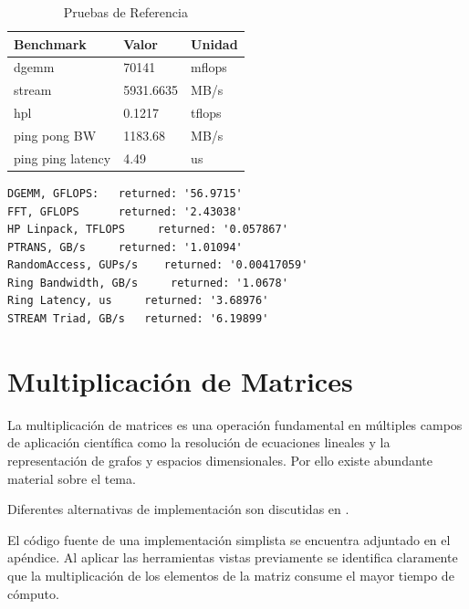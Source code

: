 \documentclass[a4paper]{report}
\begin{document}
\begin{table}[H]
\caption{Pruebas de Referencia}
  \begin{center}
    \begin{tabular}{|l|l|l|}\hline
      {\bf Benchmark} & {\bf Valor} & {\bf Unidad} \\ \hline
      dgemm & 70141 & mflops \\ \hline
      stream & 5931.6635 & MB/s \\ \hline
      hpl & 0.1217 & tflops \\ \hline
      ping pong BW & 1183.68 & MB/s \\ \hline
      ping ping latency & 4.49 & us \\ \hline
    \end{tabular}
    \end{center}
 \label{table:pruebas}
\end{table}

\begin{verbatim}
DGEMM, GFLOPS:   returned: '56.9715'
FFT, GFLOPS      returned: '2.43038'
HP Linpack, TFLOPS     returned: '0.057867'
PTRANS, GB/s     returned: '1.01094'
RandomAccess, GUPs/s    returned: '0.00417059'
Ring Bandwidth, GB/s     returned: '1.0678'
Ring Latency, us     returned: '3.68976'
STREAM Triad, GB/s   returned: '6.19899'
\end{verbatim}

\section{Multiplicaci\'on de Matrices}

La multiplicaci\'on de matrices es una operaci\'on fundamental en m\'ultiples
campos de aplicaci\'on cient\'ifica como la resoluci\'on de ecuaciones
lineales y la representaci\'on de grafos y espacios dimensionales. Por ello
existe abundante material sobre el tema.

{\small

}

Diferentes alternativas de implementaci\'on son discutidas en
\cite{mm-matrixmultiplicationtool}.

\bigskip

El c\'odigo fuente de una implementaci\'on simplista se encuentra adjuntado en
el ap\'endice. Al aplicar las herramientas vistas previamente se identifica
claramente que la multiplicaci\'on de los elementos de la matriz consume el
mayor tiempo de c\'omputo.

\bigskip
\end{document}
